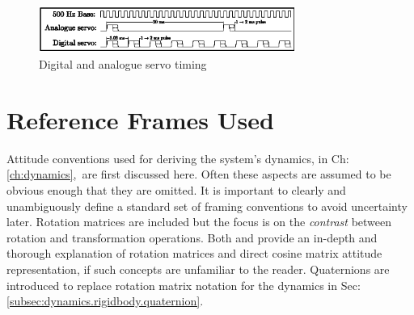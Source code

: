\begin{figure}
\centering
\includegraphics[width=0.75\textwidth]{figs/servo-timing}
\caption{Digital and analogue servo timing}
\label{fig:servo-timing}
\vspace{-20pt}
\end{figure}
\section{Reference Frames Used}
\label{sec:proto.conventions}
Attitude conventions used for deriving the system's dynamics, in Ch:\ref{ch:dynamics},~are first discussed here. Often these aspects are assumed to be obvious enough that they are omitted. It is important to clearly and unambiguously define a standard set of framing conventions to avoid uncertainty later. Rotation matrices are included but the focus is on the \emph{contrast} between rotation and transformation operations. Both \cite{spacecraftattitutdequaternions} and \cite{rigidbodylecture} provide an in-depth and thorough explanation of rotation matrices and direct cosine matrix attitude representation, if such concepts are unfamiliar to the reader. Quaternions are introduced to replace rotation matrix notation for the dynamics in Sec:\ref{subsec:dynamics.rigidbody.quaternion}.
